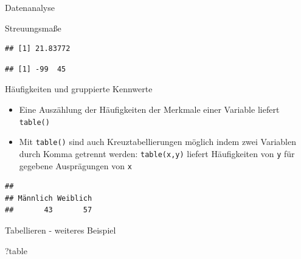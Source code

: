 \documentclass[ignorenonframetext,]{beamer}
\newenvironment{Shaded}{}{}
\newcommand{\KeywordTok}[1]{\textcolor[rgb]{0.00,0.44,0.13}{\textbf{{#1}}}}
\newcommand{\DataTypeTok}[1]{\textcolor[rgb]{0.56,0.13,0.00}{{#1}}}
\newcommand{\NormalTok}[1]{{#1}}
\providecommand{\tightlist}{%
\setlength{\itemsep}{0pt}\setlength{\parskip}{0pt}}
\begin{document}
\begin{frame}[fragile]{Datenanalyse}
\begin{block}{Streuungsmaße}
\begin{Shaded}
\end{Shaded}

\begin{verbatim}
## [1] 21.83772
\end{verbatim}

\begin{Shaded}
\end{Shaded}

\begin{verbatim}
## [1] -99  45
\end{verbatim}

\end{block}

\begin{block}{Häufigkeiten und gruppierte Kennwerte}

\begin{itemize}
\tightlist
\item
  Eine Auszählung der Häufigkeiten der Merkmale einer Variable liefert
  \texttt{table()}
\item
  Mit \texttt{table()} sind auch Kreuztabellierungen möglich indem zwei
  Variablen durch Komma getrennt werden: \texttt{table(x,y)} liefert
  Häufigkeiten von \texttt{y} für gegebene Ausprägungen von \texttt{x}
\end{itemize}

\begin{Shaded}
\end{Shaded}

\begin{verbatim}
## 
## Männlich Weiblich 
##       43       57
\end{verbatim}

\end{block}

\begin{block}{Tabellieren - weiteres Beispiel}

\begin{Shaded}
\begin{Highlighting}[]
\NormalTok{?table}
\end{Highlighting}
\end{Shaded}


\end{block}
\end{frame}
\end{document}
